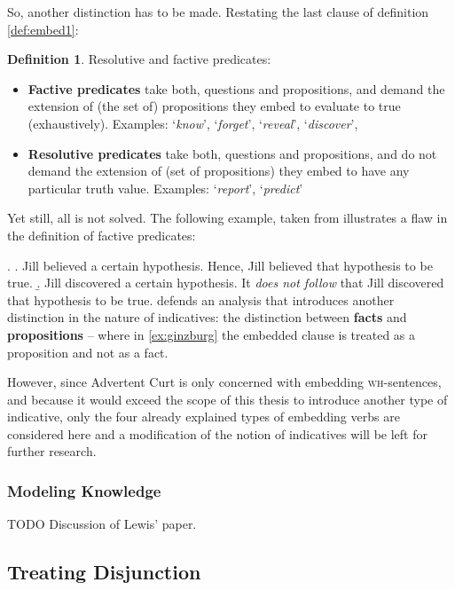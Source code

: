 \documentclass[a4paper]{article}
\newcommand{\term}[1]{\textsf{\textbf{#1}}} %
\newcommand{\pn}{\textsf} %
\newcommand{\example}[1]{`\textit{#1}'} %
\newcommand{\wh}{\textsc{wh}}
\newcommand{\acurt}{\pn{Advertent Curt}}
\theoremstyle{remark}
\theoremstyle{remark}
\theoremstyle{definition}
\newtheorem{definition}[thm]{Definition}
\theoremstyle{definition}
\begin{document}
So, another distinction has to be made. Restating the last clause of definition
\ref{def:embed1}:

\begin{definition}
  Resolutive and factive predicates:
  \begin{itemize}
  \item \term{Factive predicates} take both, questions and propositions, and
  demand the extension of (the set of) propositions they embed to evaluate to true (exhaustively).
  Examples:
  \example{know}, \example{forget}, \example{reveal}, \example{discover},
  \item \term{Resolutive predicates} take both, questions and propositions, and
  do not demand the extension of (set of propositions) they embed to have any particular truth value.
  Examples:
  \example{report}, \example{predict}
  \end{itemize}
\end{definition}

Yet still, all is not solved. The following example, taken from \cite[example
(27)]{ginzburg} illustrates a flaw in the definition of factive predicates:

\ex. \label{ex:ginzburg}
\a. Jill believed a certain hypothesis. Hence, Jill believed that hypothesis
to be true.
\b. Jill discovered a certain hypothesis. It \emph{does not follow} that Jill
discovered that hypothesis to be true. \cite{ginzburg} defends an analysis that
introduces another distinction in the nature of indicatives: the distinction
between \term{facts} and \term{propositions} -- where in \ref{ex:ginzburg} the
embedded clause is treated as a proposition and not as a fact.

However, since \acurt{} is only concerned with embedding \wh-sentences, and
because it would exceed the scope of this thesis to introduce another type of
indicative, only the four already explained types of embedding verbs are 
considered here and a modification of the notion of indicatives will be left for
further research.

\subsubsection{Modeling Knowledge}\label{sec:epistemic}

TODO Discussion of Lewis' paper.

\subsection{Treating Disjunction}
\end{document}
